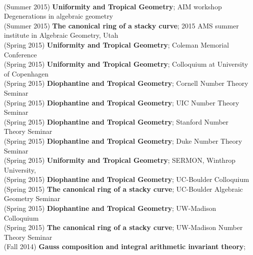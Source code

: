 \documentclass[margin,line]{res}
\begin{document}
\begin{resume}
\vspace{.05cm}\\
(Summer 2015) \textbf{Uniformity and Tropical Geometry};
AIM workshop Degenerations in algebraic geometry
\vspace{.05cm}\\
(Summer 2015) \textbf{The canonical ring of a stacky curve};  
2015 AMS summer institute in Algebraic Geometry, Utah
\vspace{.05cm}\\
(Spring 2015) \textbf{Uniformity and Tropical Geometry};
Coleman Memorial Conference
\vspace{.05cm}\\
(Spring 2015) \textbf{Uniformity and Tropical Geometry};
Colloquium at University of Copenhagen
\vspace{.05cm}\\
(Spring 2015) \textbf{Diophantine and Tropical Geometry};
Cornell Number Theory Seminar
\vspace{.05cm}\\
(Spring 2015) \textbf{Diophantine and Tropical Geometry};
UIC Number Theory Seminar
\vspace{.05cm}\\
(Spring 2015) \textbf{Diophantine and Tropical Geometry};
Stanford Number Theory Seminar
\vspace{.05cm}\\
(Spring 2015) \textbf{Diophantine and Tropical Geometry};
Duke Number Theory Seminar
\vspace{.05cm}\\
(Spring 2015) \textbf{Uniformity and Tropical Geometry};
SERMON, Winthrop University, 
\vspace{.05cm}\\
(Spring 2015) \textbf{Diophantine and Tropical Geometry};
UC-Boulder Colloquium
\vspace{.05cm}\\
(Spring 2015) \textbf{The canonical ring of a stacky curve};  
UC-Boulder Algebraic Geometry Seminar
\vspace{.05cm}\\
(Spring 2015) \textbf{Diophantine and Tropical Geometry};
UW-Madison Colloquium
\vspace{.05cm}\\
(Spring 2015) \textbf{The canonical ring of a stacky curve};  
UW-Madison Number Theory Seminar
\vspace{.05cm}\\
(Fall 2014) \textbf{Gauss composition and integral arithmetic invariant theory};  

\end{resume}
\end{document}

